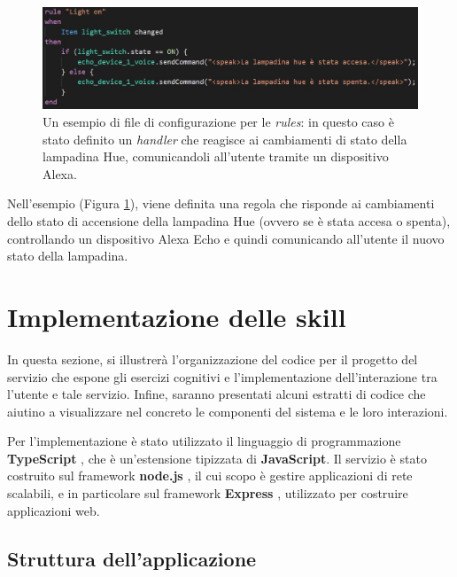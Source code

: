 \begin{figure}[!ht]
  \centering
  \includegraphics[scale=0.59]{resources/images/implementation/code/rule-code-example.jpg}
  \caption{
    Un esempio di file di configurazione per le \textit{rules}: in questo caso
    è stato definito un \textit{handler} che reagisce ai cambiamenti di stato
    della lampadina Hue, comunicandoli all'utente tramite un dispositivo Alexa.
  }
  \label{fig:figure5.4}
\end{figure}

Nell’esempio (Figura \ref{fig:figure5.4}), viene definita una regola che
risponde ai cambiamenti dello stato di accensione della lampadina Hue (ovvero
se è stata accesa o spenta), controllando un dispositivo Alexa Echo e quindi
comunicando all’utente il nuovo stato della lampadina.

\section{Implementazione delle skill}
\label{sec:Sezione5.2}

In questa sezione, si illustrerà l’organizzazione del codice per il progetto
del servizio che espone gli esercizi cognitivi e l’implementazione
dell’interazione tra l’utente e tale servizio. Infine, saranno presentati
alcuni estratti di codice che aiutino a visualizzare nel concreto le componenti
del sistema e le loro interazioni.

Per l’implementazione è stato utilizzato il linguaggio di programmazione
\textbf{TypeScript} \cite{TYPESCRIPT}, che è un’estensione tipizzata di
\textbf{JavaScript}. Il servizio è stato costruito sul framework
\textbf{node.js} \cite{NODE.JS}, il cui scopo è gestire applicazioni di rete
scalabili, e in particolare sul framework \textbf{Express} \cite{EXPRESS},
utilizzato per costruire applicazioni web.

\subsection{Struttura dell'applicazione}
\label{subsec:Sezione5.2.1}


